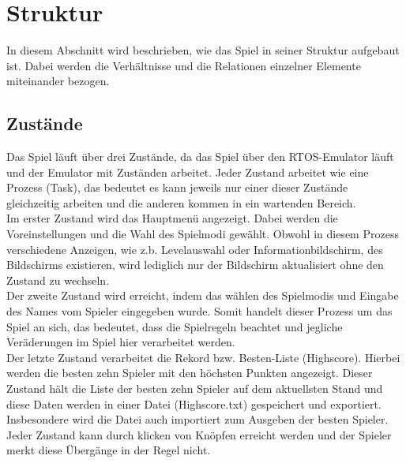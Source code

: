 
\chapter{Struktur}
\label{Struktur}
%
In diesem Abschnitt wird beschrieben, wie das Spiel in seiner Struktur aufgebaut ist. Dabei werden die Verh{\"a}ltnisse und die Relationen einzelner Elemente miteinander bezogen. 
%

\section{Zust{\"a}nde}
\label{Zustaende}
% 
Das Spiel l{\"a}uft {\"u}ber drei Zust{\"a}nde, da das Spiel {\"u}ber den RTOS-Emulator l{\"a}uft und der Emulator mit Zust{\"a}nden arbeitet. Jeder Zustand arbeitet wie eine Prozess (Task), das bedeutet es kann jeweils nur einer dieser Zust{\"a}nde gleichzeitig arbeiten und die anderen kommen in ein wartenden Bereich. \\
Im erster Zustand wird das Hauptmen{\"u} angezeigt. Dabei werden die Voreinstellungen und die Wahl des Spielmodi gew{\"a}hlt. Obwohl in diesem Prozess verschiedene Anzeigen, wie z.b. Levelauswahl oder Informationbildschirm, des Bildschirms existieren, wird lediglich nur der Bildschirm aktualisiert ohne den Zustand zu wechseln. \\
Der zweite Zustand wird erreicht, indem das w{\"a}hlen des Spielmodis und Eingabe des Names vom Spieler eingegeben wurde. Somit handelt dieser Prozess um das Spiel an sich, das bedeutet, dass die Spielregeln beachtet und jegliche Ver{\"a}derungen im Spiel hier verarbeitet werden. \\
Der letzte Zustand verarbeitet die Rekord bzw. Besten-Liste (Highscore). Hierbei werden die besten zehn Spieler mit den h{\"ochsten} Punkten angezeigt. Dieser Zustand h{\"a}lt die Liste der besten zehn Spieler auf dem aktuellsten Stand und diese Daten werden in einer Datei (\glqq Highscore.txt\grqq{}) gespeichert und exportiert. Insbesondere wird die Datei auch importiert zum Ausgeben der besten Spieler. \\
Jeder Zustand kann durch klicken von Kn{\"o}pfen erreicht werden und der Spieler merkt diese {\"U}berg{\"a}nge in der Regel nicht.
%

%
